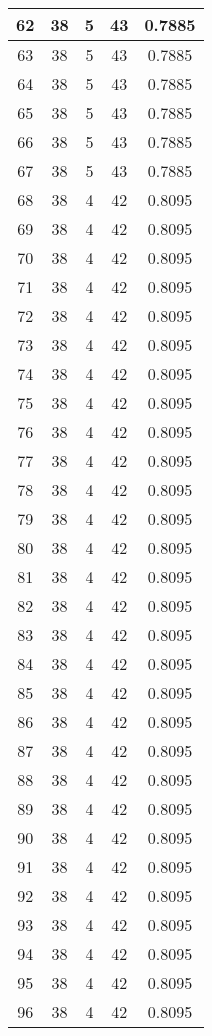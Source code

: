 \documentclass[letterpaper, 12pt]{article}
\begin{document}
\begin{longtable}{|c|c|c|c|c|}
\hline
62 & 38 & 5 & 43 & 0.7885 \\
\hline
63 & 38 & 5 & 43 & 0.7885 \\
\hline
64 & 38 & 5 & 43 & 0.7885 \\
\hline
65 & 38 & 5 & 43 & 0.7885 \\
\hline
66 & 38 & 5 & 43 & 0.7885 \\
\hline
67 & 38 & 5 & 43 & 0.7885 \\
\hline
68 & 38 & 4 & 42 & 0.8095 \\
\hline
69 & 38 & 4 & 42 & 0.8095 \\
\hline
70 & 38 & 4 & 42 & 0.8095 \\
\hline
71 & 38 & 4 & 42 & 0.8095 \\
\hline
72 & 38 & 4 & 42 & 0.8095 \\
\hline
73 & 38 & 4 & 42 & 0.8095 \\
\hline
74 & 38 & 4 & 42 & 0.8095 \\
\hline
75 & 38 & 4 & 42 & 0.8095 \\
\hline
76 & 38 & 4 & 42 & 0.8095 \\
\hline
77 & 38 & 4 & 42 & 0.8095 \\
\hline
78 & 38 & 4 & 42 & 0.8095 \\
\hline
79 & 38 & 4 & 42 & 0.8095 \\
\hline
80 & 38 & 4 & 42 & 0.8095 \\
\hline
81 & 38 & 4 & 42 & 0.8095 \\
\hline
82 & 38 & 4 & 42 & 0.8095 \\
\hline
83 & 38 & 4 & 42 & 0.8095 \\
\hline
84 & 38 & 4 & 42 & 0.8095 \\
\hline
85 & 38 & 4 & 42 & 0.8095 \\
\hline
86 & 38 & 4 & 42 & 0.8095 \\
\hline
87 & 38 & 4 & 42 & 0.8095 \\
\hline
88 & 38 & 4 & 42 & 0.8095 \\
\hline
89 & 38 & 4 & 42 & 0.8095 \\
\hline
90 & 38 & 4 & 42 & 0.8095 \\
\hline
91 & 38 & 4 & 42 & 0.8095 \\
\hline
92 & 38 & 4 & 42 & 0.8095 \\
\hline
93 & 38 & 4 & 42 & 0.8095 \\
\hline
94 & 38 & 4 & 42 & 0.8095 \\
\hline
95 & 38 & 4 & 42 & 0.8095 \\
\hline
96 & 38 & 4 & 42 & 0.8095 \\

\end{longtable}
\end{document}
